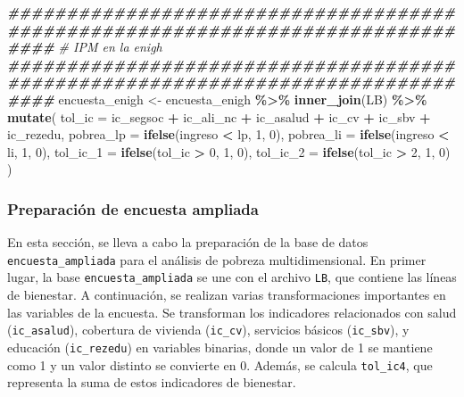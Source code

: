 \documentclass[
  12pt,
]{book}
\newenvironment{Shaded}{\begin{snugshade}}{\end{snugshade}}
\newcommand{\AttributeTok}[1]{\textcolor[rgb]{0.13,0.29,0.53}{#1}}
\newcommand{\CommentTok}[1]{\textcolor[rgb]{0.56,0.35,0.01}{\textit{#1}}}
\newcommand{\DecValTok}[1]{\textcolor[rgb]{0.00,0.00,0.81}{#1}}
\newcommand{\DocumentationTok}[1]{\textcolor[rgb]{0.56,0.35,0.01}{\textbf{\textit{#1}}}}
\newcommand{\FunctionTok}[1]{\textcolor[rgb]{0.13,0.29,0.53}{\textbf{#1}}}
\newcommand{\NormalTok}[1]{#1}
\newcommand{\OtherTok}[1]{\textcolor[rgb]{0.56,0.35,0.01}{#1}}
\newcommand{\SpecialCharTok}[1]{\textcolor[rgb]{0.81,0.36,0.00}{\textbf{#1}}}
\begin{document}
\begin{Shaded}
\begin{Highlighting}[]
\DocumentationTok{\#\#\#\#\#\#\#\#\#\#\#\#\#\#\#\#\#\#\#\#\#\#\#\#\#\#\#\#\#\#\#\#\#\#\#\#\#\#\#\#\#\#\#\#\#\#\#\#\#\#\#\#\#\#\#\#\#\#\#\#\#\#\#\#\#\#\#\#\#\#\#\#\#\#\#\#\#\#\#\#}
\CommentTok{\# IPM en la enigh}
\DocumentationTok{\#\#\#\#\#\#\#\#\#\#\#\#\#\#\#\#\#\#\#\#\#\#\#\#\#\#\#\#\#\#\#\#\#\#\#\#\#\#\#\#\#\#\#\#\#\#\#\#\#\#\#\#\#\#\#\#\#\#\#\#\#\#\#\#\#\#\#\#\#\#\#\#\#\#\#\#\#\#\#\#}
\NormalTok{encuesta\_enigh }\OtherTok{\textless{}{-}}\NormalTok{ encuesta\_enigh }\SpecialCharTok{\%\textgreater{}\%}
  \FunctionTok{inner\_join}\NormalTok{(LB) }\SpecialCharTok{\%\textgreater{}\%}
  \FunctionTok{mutate}\NormalTok{(}
    \AttributeTok{tol\_ic =}\NormalTok{ ic\_segsoc }\SpecialCharTok{+}\NormalTok{ ic\_ali\_nc }\SpecialCharTok{+}\NormalTok{ ic\_asalud }\SpecialCharTok{+}\NormalTok{ ic\_cv }\SpecialCharTok{+}\NormalTok{ ic\_sbv }\SpecialCharTok{+}\NormalTok{ ic\_rezedu,}
    \AttributeTok{pobrea\_lp =} \FunctionTok{ifelse}\NormalTok{(ingreso }\SpecialCharTok{\textless{}}\NormalTok{ lp, }\DecValTok{1}\NormalTok{, }\DecValTok{0}\NormalTok{),}
    \AttributeTok{pobrea\_li =} \FunctionTok{ifelse}\NormalTok{(ingreso }\SpecialCharTok{\textless{}}\NormalTok{ li, }\DecValTok{1}\NormalTok{, }\DecValTok{0}\NormalTok{),}
    \AttributeTok{tol\_ic\_1 =} \FunctionTok{ifelse}\NormalTok{(tol\_ic }\SpecialCharTok{\textgreater{}} \DecValTok{0}\NormalTok{, }\DecValTok{1}\NormalTok{, }\DecValTok{0}\NormalTok{),}
    \AttributeTok{tol\_ic\_2 =} \FunctionTok{ifelse}\NormalTok{(tol\_ic }\SpecialCharTok{\textgreater{}} \DecValTok{2}\NormalTok{, }\DecValTok{1}\NormalTok{, }\DecValTok{0}\NormalTok{)}
\NormalTok{  )}
\end{Highlighting}
\end{Shaded}

\hypertarget{preparaciuxf3n-de-encuesta-ampliada}{%
\subsubsection*{Preparación de encuesta ampliada}\label{preparaciuxf3n-de-encuesta-ampliada}}

En esta sección, se lleva a cabo la preparación de la base de datos \texttt{encuesta\_ampliada} para el análisis de pobreza multidimensional. En primer lugar, la base \texttt{encuesta\_ampliada} se une con el archivo \texttt{LB}, que contiene las líneas de bienestar. A continuación, se realizan varias transformaciones importantes en las variables de la encuesta. Se transforman los indicadores relacionados con salud (\texttt{ic\_asalud}), cobertura de vivienda (\texttt{ic\_cv}), servicios básicos (\texttt{ic\_sbv}), y educación (\texttt{ic\_rezedu}) en variables binarias, donde un valor de 1 se mantiene como 1 y un valor distinto se convierte en 0. Además, se calcula \texttt{tol\_ic4}, que representa la suma de estos indicadores de bienestar.
\end{document}
